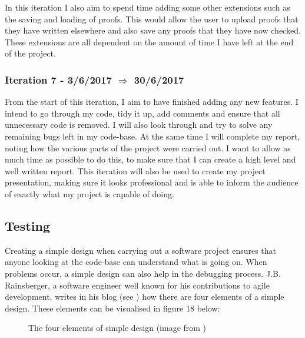 In this iteration I also aim to spend time adding some other extensions such as the saving and loading of proofs. This would allow the user to upload proofs that they have written elsewhere and also save any proofs that they have now checked. These extensions are all dependent on the amount of time I have left at the end of the project.

\subsubsection{Iteration 7 - 3/6/2017 $\Rightarrow$ 30/6/2017}

From the start of this iteration, I aim to have finished adding any new features. I intend to go through my code, tidy it up, add comments and ensure that all unnecessary code is removed. I will also look through and try to solve any remaining bugs left in my code-base. At the same time I will complete my report, noting how the various parts of the project were carried out. I want to allow as much time as possible to do this, to make sure that I can create a high level and well written report. This iteration will also be used to create my project presentation, making sure it looks professional and is able to inform the audience of exactly what my project is capable of doing.

\subsection{Testing \label{testing}}
Creating a simple design when carrying out a software project ensures that anyone looking at the code-base can understand what is going on. When problems occur, a simple design can also help in the debugging process. J.B. Rainsberger, a software engineer well known for his contributions to agile development, writes in his blog (see \cite{jBrains}) how there are four elements of a simple design. These elements can be visualised in figure 18 below:

\begin{figure}[!ht]
	\centering
	\caption{The four elements of simple design (image from \cite{SED})}
\end{figure}

